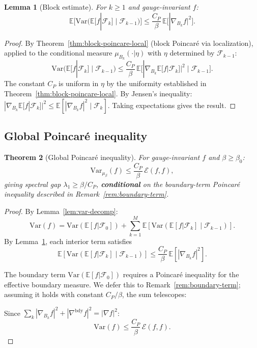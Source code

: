 \documentclass[11pt,a4paper]{article}
\theoremstyle{plain}
\newtheorem{theorem}{Theorem}[section]
\newtheorem{lemma}[theorem]{Lemma}
\theoremstyle{definition}
\theoremstyle{remark}
\newcommand{\E}{\mathbb{E}}
\newcommand{\Var}{\mathrm{Var}}
\newcommand{\cE}{\mathcal{E}}
\newcommand{\cF}{\mathcal{F}}
\begin{document}
\begin{lemma}[Block estimate]\label{lem:block-good}
For $k \geq 1$ and gauge-invariant $f$:
\begin{equation}
\E\bigl[\Var(\E[f|\cF_k] \mid \cF_{k-1})\bigr]
\leq \frac{C_P}{\beta}\,\E\bigl[|\nabla_{B_k} f|^2\bigr].
\end{equation}
\end{lemma}

\begin{proof}
By Theorem~\ref{thm:block-poincare-local} (block Poincar\'e via
localization), applied to the conditional measure
$\mu_{B_k}(\cdot|\eta)$ with $\eta$ determined by $\cF_{k-1}$:
\begin{equation}
\Var(\E[f|\cF_k] \mid \cF_{k-1})
\leq \frac{C_P}{\beta}\,
\E\bigl[|\nabla_{B_k}\E[f|\cF_k]|^2 \mid \cF_{k-1}\bigr].
\end{equation}
The constant $C_P$ is uniform in $\eta$ by the uniformity established
in Theorem~\ref{thm:block-poincare-local}. By Jensen's inequality:
$|\nabla_{B_k}\E[f|\cF_k]|^2 \leq \E[|\nabla_{B_k} f|^2 \mid \cF_k]$.
Taking expectations gives the result.
\end{proof}

\subsection{Global Poincar\'e inequality}

\begin{theorem}[Global Poincar\'e inequality]\label{thm:global-poincare}
For gauge-invariant $f$ and $\beta \geq \beta_0$:
\begin{equation}
\Var_{\mu_\beta}(f) \leq \frac{C_P}{\beta}\,\cE(f,f),
\end{equation}
giving spectral gap $\lambda_1 \geq \beta/C_P$,
\textbf{conditional} on the boundary-term Poincar\'e inequality
described in Remark~\ref{rem:boundary-term}.
\end{theorem}

\begin{proof}
By Lemma~\ref{lem:var-decomp}:
\begin{equation}
\Var(f) = \Var(\E[f|\cF_0])
+ \sum_{k=1}^M \E[\Var(\E[f|\cF_k] \mid \cF_{k-1})].
\end{equation}
By Lemma~\ref{lem:block-good}, each interior term satisfies
\begin{equation}
\E[\Var(\E[f|\cF_k] \mid \cF_{k-1})]
\leq \frac{C_P}{\beta}\,\E[|\nabla_{B_k} f|^2].
\end{equation}

The boundary term $\Var(\E[f|\cF_0])$ requires a Poincar\'e
inequality for the effective boundary measure. We defer this to
Remark~\ref{rem:boundary-term}; assuming it holds with constant
$C_P/\beta$, the sum telescopes:

Since $\sum_k |\nabla_{B_k} f|^2 + |\nabla^{\mathrm{bdy}} f|^2
= |\nabla f|^2$:
\begin{equation}
\Var(f) \leq \frac{C_P}{\beta}\,\cE(f,f).
\end{equation}
\end{proof}
\end{document}
